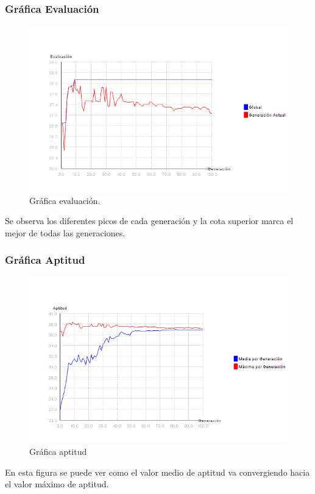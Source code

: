 \documentclass[12pt]{article}
\begin{document}
\subsubsection*{Gráfica Evaluación}
\begin{figure}[H]
\centering
\includegraphics[scale=0.4]{graficas/F2inicial_algoritmo}
\caption{Gráfica evaluación.}
\label{fig}
\end{figure}
	Se observa los diferentes picos de cada generación y la cota superior marca el mejor de todas las generaciones.

\subsubsection*{Gráfica Aptitud}
\begin{figure}[H]
\centering
\includegraphics[scale=0.4]{graficas/F2inicial_aptitud}
\caption{Gráfica aptitud}
\label{fig}
\end{figure}
	En esta figura se puede ver como el valor medio de aptitud va convergiendo hacia el valor máximo de aptitud.
\end{document}
